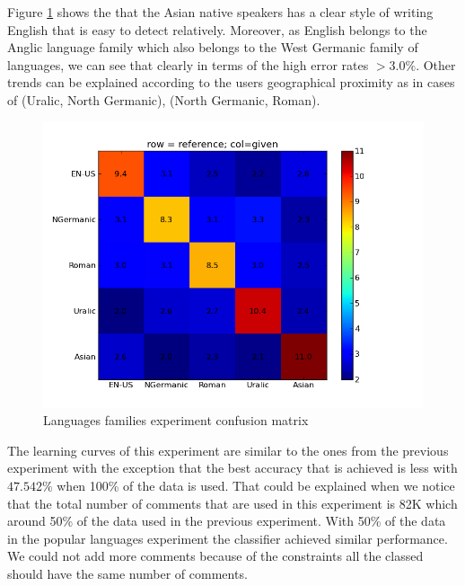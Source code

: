 \documentclass[11pt]{article}
\begin{document}
Figure \ref{fam_cfm} shows the that the Asian native speakers has a clear style of writing English that is easy to detect relatively. Moreover, as English belongs to the Anglic language family which also belongs to the West Germanic family of languages, we can see that clearly in terms of the high error rates $>3.0\%$. Other trends can be explained according to the users geographical proximity as in cases of (Uralic, North Germanic), (North Germanic, Roman).

\begin{figure}[htp]
\centering
\includegraphics[scale=0.45]{family_cfm.png}
\caption{Languages families experiment confusion matrix}
\label{fam_cfm}
\end{figure}

The learning curves of this experiment are similar to the ones from the previous experiment with the exception that the best accuracy that is achieved is less with $47.542\%$ when 100\% of the data is used. That could be explained when we notice that the total number of comments that are used in this experiment is 82K which around 50\% of the data used in the previous experiment. With 50\% of the data in the popular languages experiment the classifier achieved similar performance. We could not add more comments because of the constraints all the classed should have the same number of comments.
\end{document}
